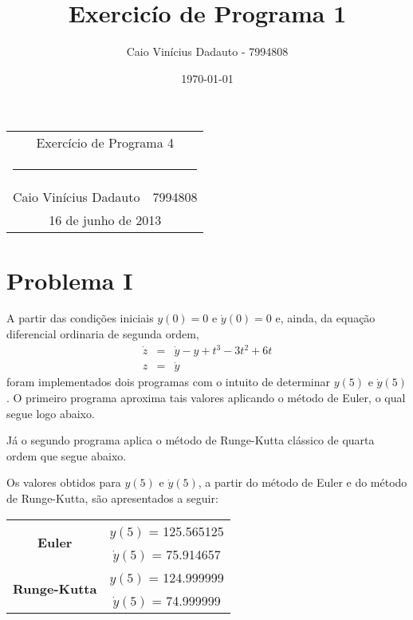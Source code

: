 \documentclass[a4paper,11pt, twoside]{article}
\date{\today}
\author{Caio Vinícius Dadauto - 7994808}
\title{Exercicío de Programa 1}
\newcommand{\n}[1]{\textbf{#1}}
\begin{document}
    \pagestyle{fancy}
    \fancyhf{}
    \renewcommand{\footrulewidth}{0.1pt}
    \renewcommand{\headrulewidth}{0.0pt}
    \fancyfoot[LE, RO]{\bfseries \thepage}

    \begin{center}
        \begin{tabular}{c}
            {\huge Exercício de Programa 4}\\[-0.5cm]
            \rule{0.6\textwidth}{0.1mm}\\
            Caio Vinícius Dadauto$\quad$7994808\\
            {\small 16 de junho de 2013}
        \end{tabular}
    \end{center}
    \vspace{2cm}

    \section*{Problema I}
    A partir das condições iniciais $y(0) = 0$ e $\dot{y}(0) = 0$ e, ainda, da equação
    diferencial ordinaria de segunda ordem,
    \begin{eqnarray}\label{dif1}
        \dot{z} & = & \dot{y} - y + t^3 - 3t^2 + 6t\\
        z & = & \dot{y}
    \end{eqnarray}
    foram implementados dois programas com o intuito de determinar $y(5)$ e $\dot{y}(5)$.
    O primeiro programa aproxima tais valores aplicando o método de Euler, 
    o qual segue logo abaixo.
    {\linespread{1.15}
    }
    
    Já o segundo programa aplica o método de Runge-Kutta clássico de quarta ordem que 
    segue abaixo.
    {\linespread{1.15}
    }
    
    Os valores obtidos para $y(5)$ e $\dot{y}(5)$, a partir do método de Euler e do método de Runge-Kutta, são 
    apresentados a seguir:
    {\linespread{1}
    \begin{table}[!th]
        \begin{center}
            \begin{tabular}{ c c }
                \toprule[0.11em]
                \multirow{2}{*}{\n{Euler}} & \n{$y(5)$} = 125.565125\\
                & \n{$\dot{y}(5)$} = 75.914657\\
                \midrule
                \multirow{2}{*}{\n{Runge-Kutta}} & \n{$y(5)$} = 124.999999\\
                & \n{$\dot{y}(5)$} = 74.999999\\
                \toprule[0.11em]
            \end{tabular}
        \end{center}
    \end{table}}
    
\end{document}
